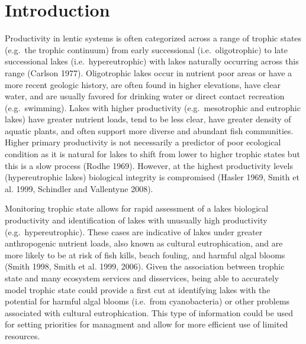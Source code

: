 \documentclass[12pt,]{article}
\begin{document}
\doublespace

\section{Introduction}\label{introduction}

Productivity in lentic systems is often categorized across a range of
trophic states (e.g.~the trophic continuum) from early successional
(i.e.~oligotrophic) to late successional lakes (i.e.~hypereutrophic)
with lakes naturally occurring across this range (Carlson 1977).
Oligotrophic lakes occur in nutrient poor areas or have a more recent
geologic history, are often found in higher elevations, have clear
water, and are usually favored for drinking water or direct contact
recreation (e.g.~swimming). Lakes with higher productivity
(e.g.~mesotrophic and eutrophic lakes) have greater nutrient loads, tend
to be less clear, have greater density of aquatic plants, and often
support more diverse and abundant fish communities. Higher primary
productivity is not necessarily a predictor of poor ecological condition
as it is natural for lakes to shift from lower to higher trophic states
but this is a slow process (Rodhe 1969). However, at the highest
productivity levels (hypereutrophic lakes) biological integrity is
compromised (Hasler 1969, Smith et al. 1999, Schindler and Vallentyne
2008).

Monitoring trophic state allows for rapid assessment of a lakes
biological productivity and identification of lakes with unusually high
productivity (e.g.~hypereutrophic). These cases are indicative of lakes
under greater anthropogenic nutrient loads, also known as cultural
eutrophication, and are more likely to be at risk of fish kills, beach
fouling, and harmful algal blooms (Smith 1998, Smith et al. 1999, 2006).
Given the association between trophic state and many ecosystem services
and disservices, being able to accurately model trophic state could
provide a first cut at identifying lakes with the potential for harmful
algal blooms (i.e.~from cyanobacteria) or other problems associated with
cultural eutrophication. This type of information could be used for
setting priorities for managment and allow for more efficient use of
limited resources.
\end{document}
